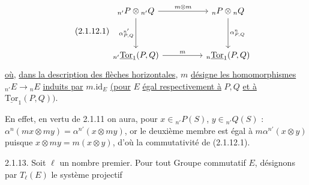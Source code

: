 \begin{equation}\tag{2.1.12.1}
\begin{tikzcd}[column sep=huge, row sep=huge]
{{}_{n'}P \otimes {}_{n'}Q} \arrow[r, "m \otimes m"] \arrow[d, "{\alpha^{n'}_{P,Q}}"'] & {{}_{n}P \otimes {}_{n}Q} \arrow[d, "{\alpha^{n}_{P,Q}}"] \\
{{}_{n'}\underline{\mathrm{Tor}}_1(P,Q)} \arrow[r, "m"] & {{}_{n}\underline{\mathrm{Tor}}_1(P,Q)}
\end{tikzcd}
\end{equation}
\underline{où}, \underline{dans la description des flèches horizontales}, $m$ \underline{désigne les homomorphismes} ${}_{n'}E \longrightarrow {}_{n}E$ \underline{induits par} $m.\mathrm{id}_E$ \underline{(pour} $E$ \underline{égal respectivement à} $P,Q$ \underline{et à} $\underline{\mathrm{Tor}}_1(P,Q))$.

En effet, en vertu de 2.1.11 on aura, pour $x \in {}_{n'}P(S)$, $y \in {}_{n'}Q(S)$ : $\alpha^n(mx \otimes my) = \alpha^{n'}(x \otimes my)$, or le deuxième membre est égal à $m\alpha^{n'}(x \otimes y)$ puisque $x \otimes my = m(x \otimes y)$, d'où la commutativité de (2.1.12.1).



2.1.13. Soit $\ell$ un nombre premier. Pour tout Groupe commutatif $E$, désignons par $T_\ell(E)$ le système projectif

